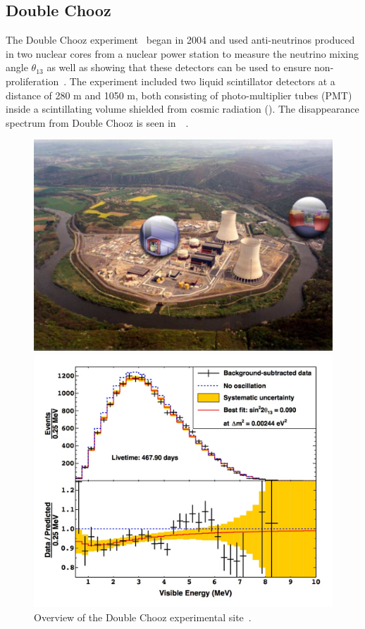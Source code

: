 \subsection{Double Chooz}
The Double Chooz experiment~\cite{127Abe, 128Abe} began in 2004 and used anti-neutrinos produced in two nuclear cores from a nuclear power station to measure the neutrino mixing angle $\theta_{13}$ as well as showing that these detectors can be used to ensure non-proliferation~\cite{45DoubleChooz, 66ReactorNP}. The experiment included two liquid scintillator detectors at a distance of 280 m and 1050 m, both consisting of photo-multiplier tubes (PMT) inside a scintillating volume shielded from cosmic radiation (). The disappearance spectrum from Double Chooz is seen in~~\cite{72Double}.

\begin{figure}[h!]
  \centering
  \begin{minipage}[b]{0.49\textwidth}
    \includegraphics[width=\textwidth]{figures/doubleChooz.jpeg}
    \vspace{2mm}
    \caption{Overview of the Double Chooz experimental site~\cite{45DoubleChooz}.}
    \label{fig:dc}
  \end{minipage}
  \hfill
  \begin{minipage}[b]{0.49\textwidth}
    \includegraphics[width=\textwidth]{figures/doubleChooz2.jpeg}

\end{minipage}
\end{figure}
